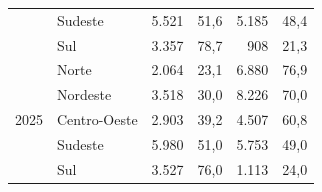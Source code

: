 \documentclass[12pt,a4paper,header]{abnt}
\begin{document}
\begin{table}[ht]
\begin{tabular}{llrrrr}
                      & Sudeste      & 5.521 & 51,6 & 5.185 & 48,4 \\
                      & Sul          & 3.357 & 78,7 &  908 & 21,3 \\
\midrule
\multirow{5}{*}{2025} & Norte        & 2.064 & 23,1 & 6.880 & 76,9 \\
                      & Nordeste     & 3.518 & 30,0 & 8.226 & 70,0 \\
                      & Centro-Oeste & 2.903 & 39,2 & 4.507 & 60,8 \\
                      & Sudeste      & 5.980 & 51,0 & 5.753 & 49,0 \\
                      & Sul          & 3.527 & 76,0 & 1.113 & 24,0 \\
\bottomrule
\end{tabular}
\end{table}
\end{document}
